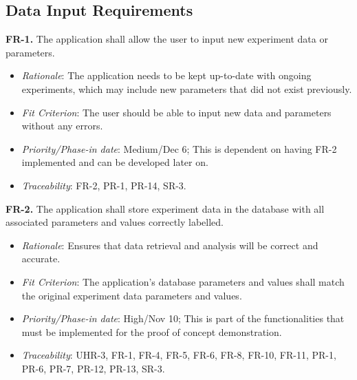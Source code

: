 \documentclass[12pt]{article}
\begin{document}
\subsection{Data Input Requirements}
\textbf{FR-1.} The application shall allow the user to input new experiment data or parameters.
  \begin{itemize}
    \item \textit{Rationale}: The application needs to be kept up-to-date with ongoing experiments, which may include new parameters that did not exist previously.
    \item \textit{Fit Criterion}: The user should be able to input new data and parameters without any errors.
    \item \textit{Priority/Phase-in date}: Medium/Dec 6; This is dependent on having FR-2 implemented and can be developed later on.
    \item \textit{Traceability}: FR-2, PR-1, PR-14, SR-3.
  \end{itemize}
\textbf{FR-2.} The application shall store experiment data in the database with all associated parameters and values correctly labelled.
  \begin{itemize}
    \item \textit{Rationale}: Ensures that data retrieval and analysis will be correct and accurate.
    \item \textit{Fit Criterion}: The application's database parameters and values shall match the original experiment data parameters and values.
    \item \textit{Priority/Phase-in date}: High/Nov 10; This is part of the functionalities that must be implemented for the proof of concept demonstration.
    \item \textit{Traceability}: UHR-3, FR-1, FR-4, FR-5, FR-6, FR-8, FR-10, FR-11, PR-1, PR-6, PR-7, PR-12, PR-13, SR-3.
  \end{itemize}
\end{document}
